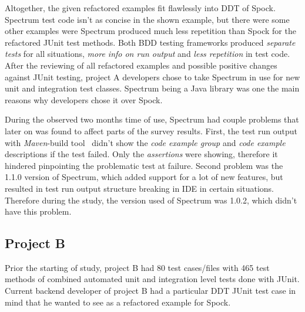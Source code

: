     Altogether, the given refactored examples fit flawlessly into DDT of Spock. Spectrum test code isn't as concise in the shown example,
    but there were some other examples were Spectrum produced much less repetition than Spock for the refactored JUnit test methods.
    Both BDD testing frameworks produced \textit{separate tests} for all situations, \textit{more info on run output} and \textit{less repetition} in test code.
    After the reviewing of all refactored examples and possible positive changes against JUnit testing, project A developers chose to take
    Spectrum in use for new unit and integration test classes. Spectrum being a Java library was one the main reasons
    why developers chose it over Spock.

    During the observed two months time of use, Spectrum had couple problems that later on was found to affect parts of the survey
    results. First, the test run output with \textit{Maven}-build tool~\cite{maven} didn't show the \textit{code example group} and \textit{code example}
    descriptions if the test failed. Only the \textit{assertions} were showing, therefore it hindered pinpointing the problematic test at failure.
    Second problem was the 1.1.0 version of Spectrum, which added support for a lot of new features, but resulted in test
    run output structure breaking in IDE in certain situations. Therefore during the study, the version used of Spectrum was 1.0.2,
    which didn't have this problem.

    \clearpage

    \subsection{Project B}
    Prior the starting of study, project B had 80 test cases/files with 465 test methods of combined automated unit and integration level tests done with JUnit.
    Current backend developer of project B had a particular DDT JUnit test case in mind that he wanted to see as a refactored example
    for Spock.

